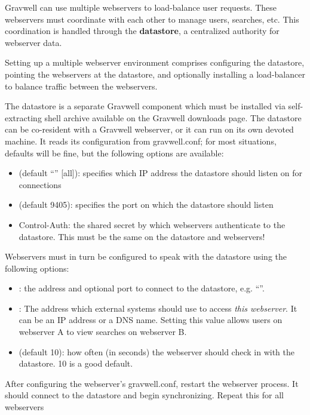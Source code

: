 Gravwell can use multiple webservers to load-balance user requests.
These webservers must coordinate with each other to manage users,
searches, etc. This coordination is handled through the \textbf{datastore}, a
centralized authority for webserver data.

Setting up a multiple webserver environment comprises configuring the
datastore, pointing the webservers at the datastore, and optionally
installing a load-balancer to balance traffic between the webservers.

The datastore is a separate Gravwell component which must be installed
via self-extracting shell archive available on the Gravwell downloads
page. The datastore can be co-resident with a Gravwell webserver, or it
can run on its own devoted machine. It reads its configuration from
gravwell.conf; for most situations, defaults will be fine, but the following
options are available:

\begin{itemize}
\item
   (default ``'' [all]): specifies which
  IP address the datastore should listen on for connections
\item
   (default 9405): specifies the port on which the
  datastore should listen
\item
  Control-Auth: the shared secret by which webservers authenticate to
  the datastore. This must be the same on the datastore and webservers!
\end{itemize}

Webservers must in turn be configured to speak with the datastore using
the following options:

\begin{itemize}
\item
  : the address and optional port to connect to the
  datastore, e.g. ``''.
\item
  : The address which external systems should use to
  access \emph{this webserver}. It can be an IP address or a DNS name.
  Setting this value allows users on webserver A to view searches on
  webserver B.
\item
   (default 10): how often (in seconds) the
  webserver should check in with the datastore. 10 is a good default.
\end{itemize}

After configuring the webserver's gravwell.conf, restart the webserver
process. It should connect to the datastore and begin synchronizing.
Repeat this for all webservers

